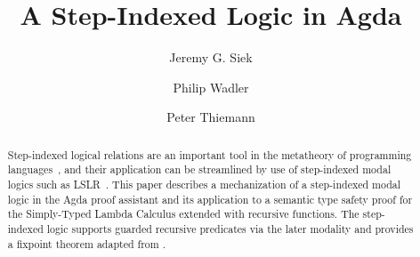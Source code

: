 \documentclass[acmsmall]{acmart}
\begin{document}
\title{A Step-Indexed Logic in Agda}

\author{Jeremy G. Siek}

\author{Philip Wadler}

\author{Peter Thiemann}


%
%
%
%



\begin{abstract}
  Step-indexed logical relations are an important tool in the
  metatheory of programming
  languages~\citep{Appel:2001aa,Ahmed:2006aa}, and their application
  can be streamlined by use of step-indexed modal logics such as
  LSLR~\citep{Dreyer:2011wl}.  This paper describes a mechanization of
  a step-indexed modal logic in the Agda proof assistant and its
  application to a semantic type safety proof for the Simply-Typed
  Lambda Calculus extended with recursive functions. The step-indexed
  logic supports guarded recursive predicates via the later modality
  and provides a fixpoint theorem adapted from \citet{Appel:2001aa}.
\end{abstract}
\end{document}
